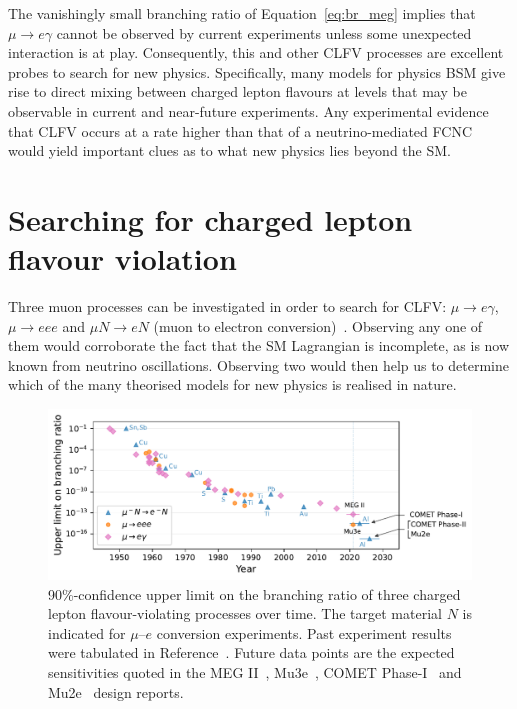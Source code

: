 The vanishingly small branching ratio of Equation~\ref{eq:br_meg} implies that
$\mu\rightarrow e\gamma$ cannot be observed by current experiments unless some
unexpected interaction is at play. Consequently, this and other CLFV processes
are excellent probes to search for new physics. Specifically, many models for
physics BSM give rise to direct mixing between charged lepton flavours at levels
that may be observable in current and near-future experiments. Any experimental
evidence that CLFV occurs at a rate higher than that of a neutrino-mediated FCNC
would yield important clues as to what new physics lies beyond the SM.

\section{Searching for charged lepton flavour violation}\label{sec:clfv}

Three muon processes can be investigated in order to search for CLFV: ${\mu
\rightarrow e\gamma}$, ${\mu \rightarrow eee}$ and ${\mu N \rightarrow e N}$
(muon to electron conversion)~\cite{BERNSTEIN201327}. Observing any one of them
would corroborate the fact that the SM Lagrangian is incomplete, as is now known
from neutrino oscillations. Observing two would then help us to determine which
of the many theorised models for new physics is realised in nature. 


\begin{figure}
    \centering
    \includegraphics[width=\textwidth]{chapter1/clfv_upper_limit_v2.pdf}
    \caption{
        90\%-confidence upper limit on the branching ratio of three charged
        lepton flavour-violating processes over time. 
        The target material $N$ is indicated for $\mu$--$e$ conversion experiments.
        Past experiment results
        were tabulated in Reference~\cite{BERNSTEIN201327}. Future data points are the
        expected sensitivities quoted in the MEG II~\cite{Baldini2018},
        Mu3e~\cite{ARNDT2021165679}, COMET
        Phase-I~\cite{the_comet_collaboration_comet_2020} and
        Mu2e~\cite{bartoszek2015mu2e} design reports.
    }
    \label{fig:clfv_upper_limit}
\end{figure}

